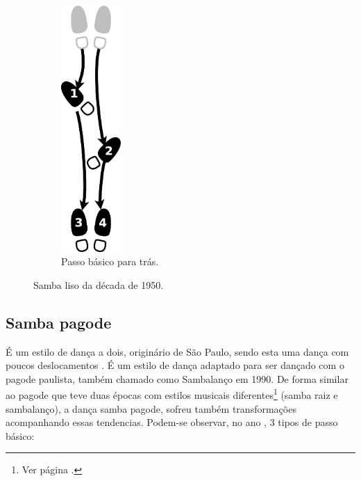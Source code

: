 \begin{figure}[h]
    \begin{subfigure}[b]{0.4\textwidth}
        \centering
	\includegraphics[width=0.25\textwidth]{chapters/cap-historia-dancasamba/samba-liso-basico-tras.eps}
        \caption{Passo básico para trás.}
        \label{fig:samba-liso-basico-tras}
    \end{subfigure}
    \caption{Samba liso da década de 1950.}\label{fig:samba-liso-basico}
\end{figure}

\subsection{Samba pagode} 
É um estilo de dança a dois, originário de São Paulo, 
sendo esta uma dança com poucos deslocamentos \cite[pp. 134]{perna2002samba}.
É um estilo de dança adaptado para ser dançado com o pagode paulista,
também chamado como Sambalanço em 1990.
De forma similar ao pagode que teve duas épocas com estilos musicais diferentes\footnote{Ver página \pageref{ref:sambalanco}.}
(samba raiz e sambalanço),
a dança samba pagode, sofreu também transformações acompanhando essas tendencias.
Podem-se observar, no ano \AnoLivro, 3 tipos de passo básico: 

